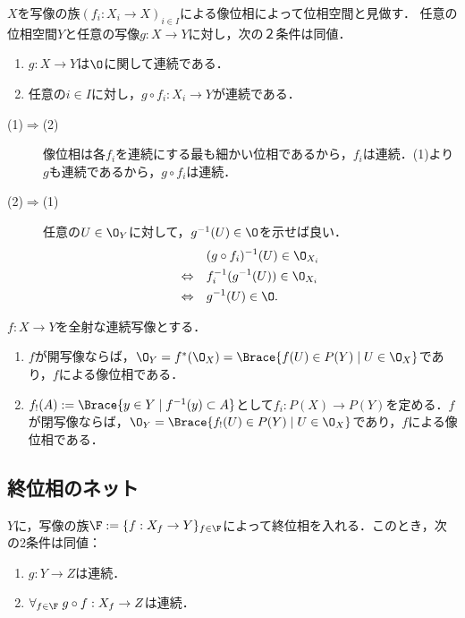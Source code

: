 \documentclass[uplatex,dvipdfmx]{jsreport}
\begin{document}
\begin{proposition}[終位相の普遍性]
    $X$を写像の族$(f_i:X_i\to X)_{i\in I}$による像位相によって位相空間と見做す．
    任意の位相空間$Y$と任意の写像$g:X\to Y$に対し，次の２条件は同値．
    \begin{enumerate}
        \item $g:X\to Y$は$\O$に関して連続である．
        \item 任意の$i\in I$に対し，$g\circ f_i:X_i\to Y$が連続である．
    \end{enumerate}
\end{proposition}
\begin{Proof}\mbox{}
    \begin{description}
        \item[(1)$\Rightarrow$(2)] 像位相は各$f_i$を連続にする最も細かい位相であるから，$f_i$は連続．(1)より$g$も連続であるから，$g\circ f_i$は連続．
        \item[(2)$\Rightarrow$(1)] 任意の$U\in\O_Y$に対して，$g^{-1}(U)\in\O$を示せば良い．
        \begin{align*}
            &(g\circ f_i)^{-1}(U)\in\O_{X_i}\\
            \Leftrightarrow\quad&f^{-1}_i(g^{-1}(U))\in\O_{X_i}\\
            \Leftrightarrow\quad&g^{-1}(U)\in\O.
        \end{align*}
    \end{description}
\end{Proof}

\begin{proposition}
    $f:X\to Y$を全射な連続写像とする．
    \begin{enumerate}
        \item $f$が開写像ならば，$\O_Y=f^*(\O_X)=\Brace{f(U)\in P(Y)\mid U\in\O_X}$であり，$f$による像位相である．
        \item $f_!(A):=\Brace{y\in Y\mid f^{-1}(y)\subset A}$として$f_i:P(X)\to P(Y)$を定める．$f$が閉写像ならば，$\O_Y=\Brace{f_!(U)\in P(Y)\mid U\in\O_X}$であり，$f$による像位相である．
    \end{enumerate}
\end{proposition}

\subsection{終位相のネット}

\begin{proposition}
    $Y$に，写像の族$\F:=\{f:X_f\to Y\}_{f\in\F}$によって終位相を入れる．このとき，次の2条件は同値：
    \begin{enumerate}
        \item $g:Y\to Z$は連続．
        \item $\forall_{f\in\F}\;g\circ f:X_f\to Z$は連続．
    \end{enumerate}
\end{proposition}
\end{document}
